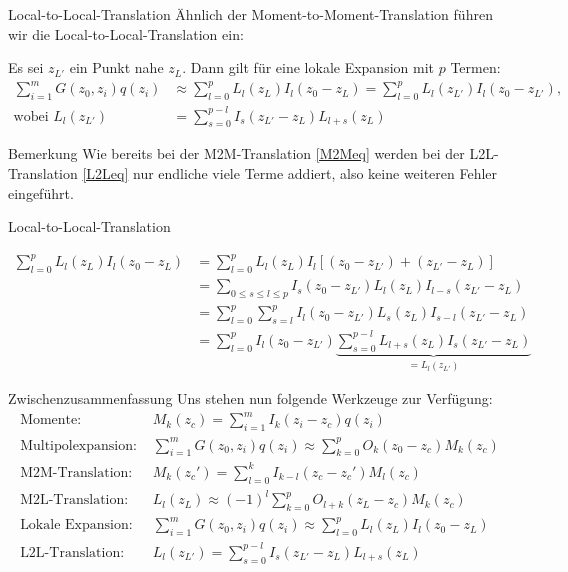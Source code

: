 \documentclass[ngerman]{beamer}
\begin{document}
\begin{frame}{Local-to-Local-Translation}
\normalsize
Ähnlich der Moment-to-Moment-Translation führen wir die Local-to-Local-Translation ein:
\begin{Satz}
Es sei $z_{L'}$ ein Punkt nahe $z_L$. Dann gilt für eine lokale Expansion mit $p$ Termen:
\begin{align}
\sum_{i=1}^m {G(z_0,z_i)q(z_i)} &\approx \sum_{l=0}^p L_l(z_L)I_l(z_0-z_L) = \sum_{l=0}^p L_l(z_{L'})I_l(z_0-z_{L'}),\nonumber\\
\text{wobei } L_l(z_{L'})&=\sum_{s=0}^{p-l} I_s(z_{L'}-z_L)L_{l+s}(z_L)\label{L2Leq}
\end{align}
\end{Satz}
\begin{block}{Bemerkung}
Wie bereits bei der M2M-Translation \eqref{M2Meq} werden bei der L2L-Translation \eqref{L2Leq} nur endliche viele Terme addiert, also keine weiteren Fehler eingeführt.
\end{block}
\end{frame}

\begin{frame}{Local-to-Local-Translation}
\begin{Beweis}
\begin{align*}
\sum_{l=0}^p L_l(z_L)I_l(z_0-z_L) &= \sum_{l=0}^p L_l(z_L)I_l\left[(z_0-z_{L'}) + (z_{L'}-z_L)\right]\\
&=\sum_{0\leq s\leq l \leq p} I_s(z_0-z_{L'}) L_l(z_L)I_{l-s}(z_{L'}-z_L)\\
&=\sum_{l=0}^p \sum_{s=l}^p I_l(z_0-z_{L'}) L_s(z_L)I_{s-l}(z_{L'}-z_L) \\
&=\sum_{l=0}^p I_l(z_0-z_{L'}) \underbrace{\sum_{s=0}^{p-l}  L_{l+s}(z_L)I_{s}(z_{L'}-z_L)}_{=L_l(z_{L'})}
\end{align*}
\end{Beweis}
\end{frame}

\begin{frame}{Zwischenzusammenfassung}
Uns stehen nun folgende Werkzeuge zur Verfügung:
\small
\begin{align*}
\text{Momente: }& M_k(z_c) =  \sum_{i=1}^m I_k(z_i-z_c) q(z_i)\\
\text{Multipolexpansion: }&\sum_{i=1}^m {G(z_0,z_i)q(z_i)} \approx \sum_{k=0}^p O_k(z_0-z_c)M_k(z_c)\\
\text{M2M-Translation: }& M_k(z_c') = \sum_{l=0}^k I_{k-l}(z_c-z_c')M_l(z_c)\\
\text{M2L-Translation: }&L_l(z_L)\approx(-1)^l\sum_{k=0}^p O_{l+k}(z_L-z_c)M_k(z_c) \\
\text{Lokale Expansion: }&\sum_{i=1}^m {G(z_0,z_i)q(z_i)} \approx \sum_{l=0}^p L_l(z_L)I_l(z_0-z_L)\\
\text{L2L-Translation: }&L_l(z_{L'})=\sum_{s=0}^{p-l} I_s(z_{L'}-z_L)L_{l+s}(z_L)
\end{align*}
\end{frame}
\end{document}
